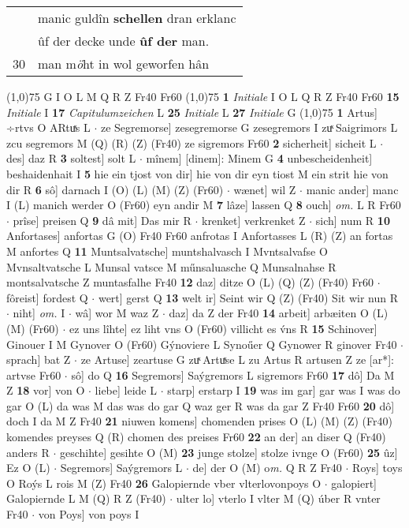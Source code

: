\documentclass[8pt,a4paper,notitlepage]{article}
\begin{document}
\begin{table}[ht]
\begin{minipage}[t]{0.5\linewidth}
\begin{tabular}{rl}
 & manic guldîn \textbf{schellen} dran erklanc\\ 
 & ûf der decke unde \textbf{ûf der} man.\\ 
30 & man m\textit{ö}ht in wol geworfen hân\\ 
\end{tabular}
\scriptsize
\line(1,0){75} \newline
G I O L M Q R Z Fr40 Fr60 \newline
\line(1,0){75} \newline
\textbf{1} \textit{Initiale} I O L Q R Z Fr40 Fr60  \textbf{15} \textit{Initiale} I  \textbf{17} \textit{Capitulumzeichen} L  \textbf{25} \textit{Initiale} L  \textbf{27} \textit{Initiale} G  \newline
\line(1,0){75} \newline
\textbf{1} Artus] ÷rtvs O ARtuͯs L  $\cdot$ ze Segremorse] zesegremorse G zesegremors I zuͯ Saigrimors L zcu segremors M (Q) (R) (Z) (Fr40) ze sigremors Fr60 \textbf{2} sicherheit] sicheit L  $\cdot$ des] daz R \textbf{3} soltest] solt L  $\cdot$ mînem] [dinem]: Minem G \textbf{4} unbescheidenheit] beshaidenhait I \textbf{5} hie ein tjost von dir] hie von dir eyn tiost M ein strit hie von dir R \textbf{6} sô] darnach I (O) (L) (M) (Z) (Fr60)  $\cdot$ wænet] wil Z  $\cdot$ manic ander] manc I (L) manich werder O (Fr60) eyn andir M \textbf{7} lâze] lassen Q \textbf{8} ouch] \textit{om.} L R Fr60  $\cdot$ prîse] preisen Q \textbf{9} dâ mit] Das mir R  $\cdot$ krenket] verkrenket Z  $\cdot$ sich] num R \textbf{10} Anfortases] anfortas G (O) Fr40 Fr60 anfrotas I Anfortasses L (R) (Z) an fortas M anfortes Q \textbf{11} Muntsalvatsche] muntshalvasch I Mvntsalvafse O Mvnsaltvatsche L Munsal vatsce M műnsaluasche Q Munsalnahse R montsalvatsche Z muntasfalhe Fr40 \textbf{12} daz] ditze O (L) (Q) (Z) (Fr40) Fr60  $\cdot$ fôreist] fordest Q  $\cdot$ wert] gerst Q \textbf{13} welt ir] Seint wir Q (Z) (Fr40) Sit wir nun R  $\cdot$ niht] \textit{om.} I  $\cdot$ wâ] wor M waz Z  $\cdot$ daz] da Z der Fr40 \textbf{14} arbeit] arbæiten O (L) (M) (Fr60)  $\cdot$ ez uns lîhte] ez liht vns O (Fr60) villicht es v́ns R \textbf{15} Schinover] Ginouer I M Gynover O (Fr60) Gýnoviere L Synoűer Q Gynower R ginover Fr40  $\cdot$ sprach] bat Z  $\cdot$ ze Artuse] zeartuse G zuͯ Artuͯse L zu Artus R artusen Z ze [ar*]: artvse Fr60  $\cdot$ sô] do Q \textbf{16} Segremors] Saýgremors L sigremors Fr60 \textbf{17} dô] Da M Z \textbf{18} vor] von O  $\cdot$ liebe] leide L  $\cdot$ starp] erstarp I \textbf{19} was im gar] gar was I was do gar O (L) da was M das was do gar Q waz ger R was da gar Z Fr40 Fr60 \textbf{20} dô] doch I da M Z Fr40 \textbf{21} niuwen komens] chomenden prises O (L) (M) (Z) (Fr40) komendes preyses Q (R) chomen des preises Fr60 \textbf{22} an der] an diser Q (Fr40) anders R  $\cdot$ geschihte] gesihte O (M) \textbf{23} junge stolze] stolze ivnge O (Fr60) \textbf{25} ûz] Ez O (L)  $\cdot$ Segremors] Saýgremors L  $\cdot$ de] der O (M) o\textit{m. } Q R Z Fr40  $\cdot$ Roys] toys O Roýs L rois M (Z) Fr40 \textbf{26} Galopiernde vber vlterlovonpoys O  $\cdot$ galopiert] Galopiernde L M (Q) R Z (Fr40)  $\cdot$ ulter lo] vterlo I vlter M (Q) úber R vnter Fr40  $\cdot$ von Poys] von poys I 
\end{minipage}
\end{table}
\end{document}
